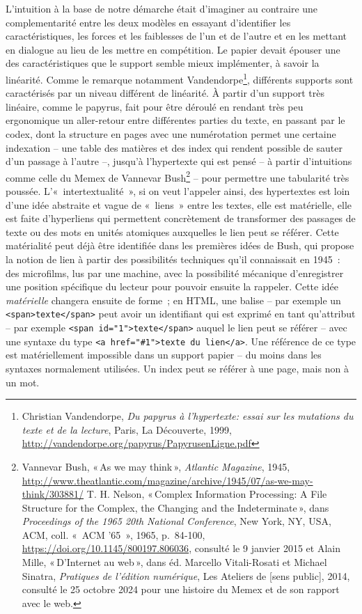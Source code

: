 L'intuition à la base de notre démarche était d'imaginer au contraire
une complementarité entre les deux modèles en essayant d'identifier les
caractéristiques, les forces et les faiblesses de l'un et de l'autre et
en les mettant en dialogue au lieu de les mettre en compétition. Le
papier devait épouser une des caractéristiques que le support semble
mieux implémenter, à savoir la linéarité. Comme le remarque notamment
Vandendorpe\footnote{Christian Vandendorpe, \emph{Du papyrus à
  l'hypertexte: essai sur les mutations du texte et de la lecture},
  Paris, La Découverte, 1999,
  \url{http://vandendorpe.org/papyrus/PapyrusenLigne.pdf}}, différents
supports sont caractérisés par un niveau différent de linéarité. À
partir d'un support très linéaire, comme le papyrus, fait pour être
déroulé en rendant très peu ergonomique un aller-retour entre
différentes parties du texte, en passant par le codex, dont la structure
en pages avec une numérotation permet une certaine indexation -- une
table des matières et des index qui rendent possible de sauter d'un
passage à l'autre --, jusqu'à l'hypertexte qui est pensé -- à partir
d'intuitions comme celle du Memex de Vannevar Bush\footnote{Vannevar
  Bush, {«\,As we may think\,»}, \emph{Atlantic Magazine}, 1945,
  \url{http://www.theatlantic.com/magazine/archive/1945/07/as-we-may-think/303881/}
  T. H. Nelson, {«\,Complex {Information} {Processing}: {A} {File}
  {Structure} for the {Complex}, the {Changing} and the
  {Indeterminate}\,»}, dans \emph{Proceedings of the 1965 20th
  {National} {Conference}}, New York, NY, USA, ACM, coll. «~{ACM} '65~»,
  1965, p.~84‑100, \url{https://doi.org/10.1145/800197.806036}, consulté
  le 9 janvier 2015 et Alain Mille, {«\,D'{Internet} au web\,»}, dans
  éd. Marcello Vitali-Rosati et Michael Sinatra, \emph{Pratiques de
  l'édition numérique}, Les Ateliers de {[}sens public{]}, 2014,
  consulté le 25 octobre 2024 pour une histoire du Memex et de son
  rapport avec le web.} -- pour permettre une tabularité très poussée.
L'«~intertextualité~», si on veut l'appeler ainsi, des hypertextes est
loin d'une idée abstraite et vague de «~liens~» entre les textes, elle
est matérielle, elle est faite d'hyperliens qui permettent concrètement
de transformer des passages de texte ou des mots en unités atomiques
auxquelles le lien peut se référer. Cette matérialité peut déjà être
identifiée dans les premières idées de Bush, qui propose la notion de
lien à partir des possibilités techniques qu'il connaissait en 1945~:
des microfilms, lus par une machine, avec la possibilité mécanique
d'enregistrer une position spécifique du lecteur pour pouvoir ensuite la
rappeler. Cette idée \emph{matérielle} changera ensuite de forme~; en
HTML, une balise -- par exemple un
\texttt{\textless{}span\textgreater{}texte\textless{}/span\textgreater{}}
peut avoir un identifiant qui est exprimé en tant qu'attribut -- par
exemple
\texttt{\textless{}span\ id="1"\textgreater{}texte\textless{}/span\textgreater{}}
auquel le lien peut se référer -- avec une syntaxe du type
\texttt{\textless{}a\ href="\#1"\textgreater{}texte\ du\ lien\textless{}/a\textgreater{}}.
Une référence de ce type est matériellement impossible dans un support
papier -- du moins dans les syntaxes normalement utilisées. Un index
peut se référer à une page, mais non à un mot.

